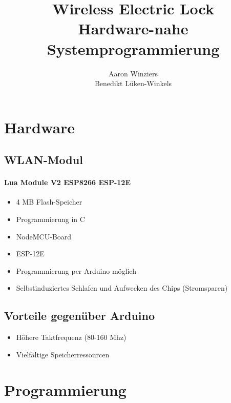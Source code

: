 \documentclass{scrartcl}
\title{Wireless Electric Lock\\ \small{Hardware-nahe Systemprogrammierung}}
\author{Aaron Winziers\\Benedikt Lüken-Winkels}
\begin{document}
\maketitle
\tableofcontents
\newpage

%
%

\section{Hardware}\label{sec:hard}


\subsection{WLAN-Modul}

\paragraph{Lua Module V2 ESP8266 ESP-12E}
\begin{itemize}
\item 4 MB Flash-Speicher
\item Programmierung in C
\item NodeMCU-Board
\item ESP-12E
\item Programmierung per Arduino möglich
\item Selbstinduziertes Schlafen und Aufwecken des Chips (Stromsparen)
\end{itemize}



\subsection{Vorteile gegenüber Arduino}

\begin{itemize}
\item Höhere Taktfrequenz (80-160 Mhz)
\item Vielfältige Speicherressourcen
\end{itemize}




\newpage

%
%

\section{Programmierung}\label{sec:soft}
\end{document}
